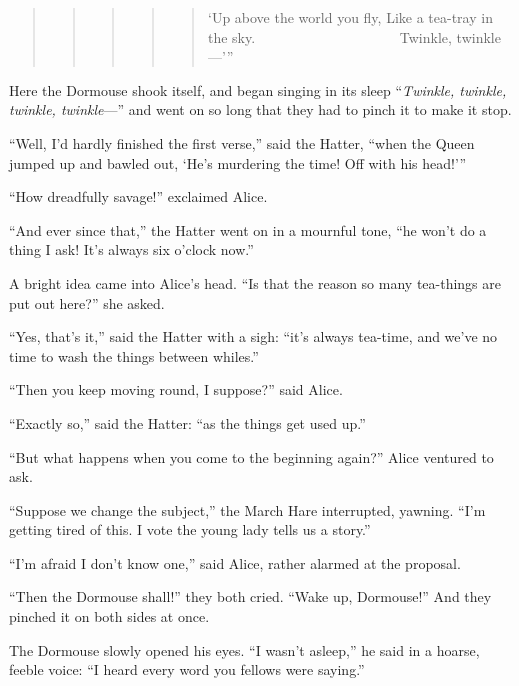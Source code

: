 \documentclass[11pt,openany,oneside]{book}
\begin{document}
\begin{quote}
\begin{quote}
\begin{quote}
\begin{quote}
\begin{quote}
{\small ‘Up above the world you fly,}\newline
{\small  Like a tea-tray in the sky.}\newline
{\small  ~~~~~~~~~~~~~~~~~~~~Twinkle, twinkle—’” }

\end{quote}
\end{quote}
\end{quote}
\end{quote}
\end{quote}
Here the Dormouse shook itself, and began singing in its sleep “{\em Twinkle, twinkle, twinkle, twinkle\/}—” and went on so long that they had to pinch it to make it stop. 

“Well, I’d hardly finished the first verse,” said the Hatter, “when the Queen jumped up and bawled out, ‘He’s murdering the time! Off with his head!’” 

“How dreadfully savage!” exclaimed Alice. 

“And ever since that,” the Hatter went on in a mournful tone, “he won’t do a thing I ask! It’s always six o’clock now.” 

A bright idea came into Alice’s head. “Is that the reason so many tea-things are put out here?” she asked. 

“Yes, that’s it,” said the Hatter with a sigh: “it’s always tea-time, and we’ve no time to wash the things between whiles.” 

“Then you keep moving round, I suppose?” said Alice. 

“Exactly so,” said the Hatter: “as the things get used up.” 

“But what happens when you come to the beginning again?” Alice ventured to ask. 

“Suppose we change the subject,” the March Hare interrupted, yawning. “I’m getting tired of this. I vote the young lady tells us a story.” 

“I’m afraid I don’t know one,” said Alice, rather alarmed at the proposal. 

“Then the Dormouse shall!” they both cried. “Wake up, Dormouse!” And they pinched it on both sides at once. 

The Dormouse slowly opened his eyes. “I wasn’t asleep,” he said in a hoarse, feeble voice: “I heard every word you fellows were saying.” 
\end{document}
